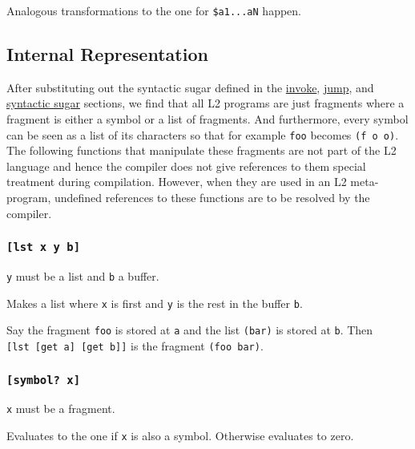\documentclass[]{article}
\begin{document}
Analogous transformations to the one for \texttt{\$a1...aN} happen.

\hypertarget{internal-representation}{%
\subsection{Internal Representation}\label{internal-representation}}

After substituting out the syntactic sugar defined in the
\protect\hyperlink{invoke}{invoke}, \protect\hyperlink{jump}{jump}, and
\protect\hyperlink{syntactic-sugar}{syntactic sugar} sections, we find
that all L2 programs are just fragments where a fragment is either a
symbol or a list of fragments. And furthermore, every symbol can be seen
as a list of its characters so that for example \texttt{foo} becomes
\texttt{(f\ o\ o)}. The following functions that manipulate these
fragments are not part of the L2 language and hence the compiler does
not give references to them special treatment during compilation.
However, when they are used in an L2 meta-program, undefined references
to these functions are to be resolved by the compiler.

\hypertarget{ux7bux5bux7dlst-x-y-bux7bux5dux7d}{%
\subsubsection{\texorpdfstring{\texttt{{[}lst\ x\ y\ b{]}}}{{[}lst x y b{]}}}\label{ux7bux5bux7dlst-x-y-bux7bux5dux7d}}

\texttt{y} must be a list and \texttt{b} a buffer.

Makes a list where \texttt{x} is first and \texttt{y} is the rest in the
buffer \texttt{b}.

Say the fragment \texttt{foo} is stored at \texttt{a} and the list
\texttt{(bar)} is stored at \texttt{b}. Then
\texttt{{[}lst\ {[}get\ a{]}\ {[}get\ b{]}{]}} is the fragment
\texttt{(foo\ bar)}.

\hypertarget{ux7bux5bux7dsymbolux3f-xux7bux5dux7d}{%
\subsubsection{\texorpdfstring{\texttt{{[}symbol?\ x{]}}}{{[}symbol? x{]}}}\label{ux7bux5bux7dsymbolux3f-xux7bux5dux7d}}

\texttt{x} must be a fragment.

Evaluates to the one if \texttt{x} is also a symbol. Otherwise evaluates
to zero.
\end{document}
